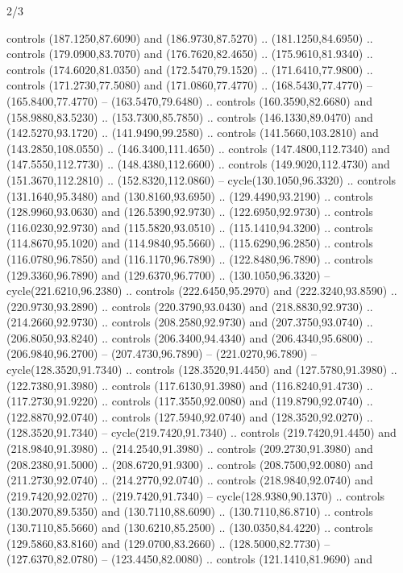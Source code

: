 \begin{flagdescription}{2/3}
\begin{scope}[xshift=0.5\flaglength,yshift=0.5\flagwidth,scale=\stretchfactor]
\begin{scope}[scale=0.001645\flagwidth,yshift=65mm,xshift=-63mm]
\begin{scope}[y=0.80pt, x=0.80pt, yscale=-1,]
\begin{scope}[cm={{1.33333,0.0,0.0,1.33333,(0.0,1e-05)}}]
  controls (187.1250,87.6090) and (186.9730,87.5270) .. (181.1250,84.6950) ..
  controls (179.0900,83.7070) and (176.7620,82.4650) .. (175.9610,81.9340) ..
  controls (174.6020,81.0350) and (172.5470,79.1520) .. (171.6410,77.9800) ..
  controls (171.2730,77.5080) and (171.0860,77.4770) .. (168.5430,77.4770) --
  (165.8400,77.4770) -- (163.5470,79.6480) .. controls (160.3590,82.6680) and
  (158.9880,83.5230) .. (153.7300,85.7850) .. controls (146.1330,89.0470) and
  (142.5270,93.1720) .. (141.9490,99.2580) .. controls (141.5660,103.2810) and
  (143.2850,108.0550) .. (146.3400,111.4650) .. controls (147.4800,112.7340) and
  (147.5550,112.7730) .. (148.4380,112.6600) .. controls (149.9020,112.4730) and
  (151.3670,112.2810) .. (152.8320,112.0860) -- cycle(130.1050,96.3320) ..
  controls (131.1640,95.3480) and (130.8160,93.6950) .. (129.4490,93.2190) ..
  controls (128.9960,93.0630) and (126.5390,92.9730) .. (122.6950,92.9730) ..
  controls (116.0230,92.9730) and (115.5820,93.0510) .. (115.1410,94.3200) ..
  controls (114.8670,95.1020) and (114.9840,95.5660) .. (115.6290,96.2850) ..
  controls (116.0780,96.7850) and (116.1170,96.7890) .. (122.8480,96.7890) ..
  controls (129.3360,96.7890) and (129.6370,96.7700) .. (130.1050,96.3320) --
  cycle(221.6210,96.2380) .. controls (222.6450,95.2970) and (222.3240,93.8590)
  .. (220.9730,93.2890) .. controls (220.3790,93.0430) and (218.8830,92.9730) ..
  (214.2660,92.9730) .. controls (208.2580,92.9730) and (207.3750,93.0740) ..
  (206.8050,93.8240) .. controls (206.3400,94.4340) and (206.4340,95.6800) ..
  (206.9840,96.2700) -- (207.4730,96.7890) -- (221.0270,96.7890) --
  cycle(128.3520,91.7340) .. controls (128.3520,91.4450) and (127.5780,91.3980)
  .. (122.7380,91.3980) .. controls (117.6130,91.3980) and (116.8240,91.4730) ..
  (117.2730,91.9220) .. controls (117.3550,92.0080) and (119.8790,92.0740) ..
  (122.8870,92.0740) .. controls (127.5940,92.0740) and (128.3520,92.0270) ..
  (128.3520,91.7340) -- cycle(219.7420,91.7340) .. controls (219.7420,91.4450)
  and (218.9840,91.3980) .. (214.2540,91.3980) .. controls (209.2730,91.3980)
  and (208.2380,91.5000) .. (208.6720,91.9300) .. controls (208.7500,92.0080)
  and (211.2730,92.0740) .. (214.2770,92.0740) .. controls (218.9840,92.0740)
  and (219.7420,92.0270) .. (219.7420,91.7340) -- cycle(128.9380,90.1370) ..
  controls (130.2070,89.5350) and (130.7110,88.6090) .. (130.7110,86.8710) ..
  controls (130.7110,85.5660) and (130.6210,85.2500) .. (130.0350,84.4220) ..
  controls (129.5860,83.8160) and (129.0700,83.2660) .. (128.5000,82.7730) --
  (127.6370,82.0780) -- (123.4450,82.0080) .. controls (121.1410,81.9690) and

\end{scope}
\end{scope}
\end{scope}
\end{scope}
\end{flagdescription}

